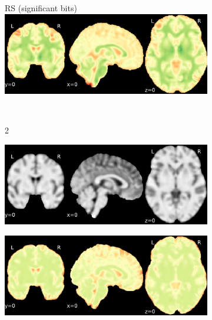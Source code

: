 \documentclass{article}
\begin{document}
\begin{appendices}
\begin{landscape}
\begin{figure}
\begin{subfigure}[t]{0.2\paperheight}
            \end{subfigure}
            \begin{subfigure}[t]{0.2\paperheight}
                \centering
                RS (significant bits)
                \includegraphics[width=\textwidth]{figures/sig/5mm/rs_ds001600_sub-1_sig.pdf}
            \end{subfigure} \\
            \begin{subfigure}[b][][c]{0.01\paperwidth} 2 \vspace*{15pt} \end{subfigure}
            \begin{subfigure}[t]{0.2\paperheight}
                \centering
                \includegraphics[width=\textwidth]{figures/sig/5mm/ieee_ds001771_sub-36.pdf}
            \end{subfigure}
            \begin{subfigure}[t]{0.2\paperheight}
                \centering
                \includegraphics[width=\textwidth]{figures/sig/5mm/rr_ds001771_sub-36_sig.pdf}

\end{subfigure}
\end{figure}
\end{landscape}
\end{appendices}
\end{document}

